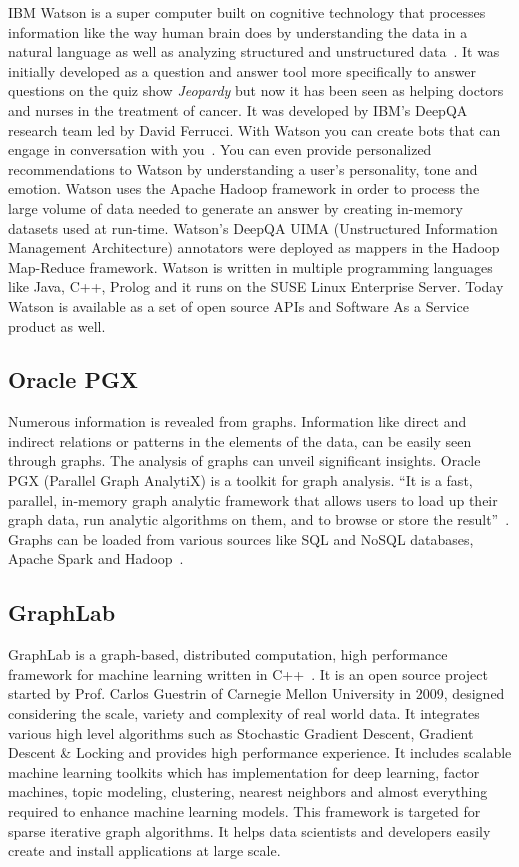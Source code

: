 IBM Watson is a super computer built on cognitive technology that
processes information like the way human brain does by understanding
the data in a natural language as well as analyzing structured and
unstructured data~\cite{www-ibmwatson-wiki}.  It was initially
developed as a question and answer tool more specifically to answer
questions on the quiz show \textit{Jeopardy} but now it has been seen as
helping doctors and nurses in the treatment of cancer. It was
developed by IBM's DeepQA research team led by David Ferrucci. With
Watson you can create bots that can engage in conversation with
you~\cite{www-ibmwatson}. You can even provide personalized
recommendations to Watson by understanding a user's personality, tone
and emotion. Watson uses the Apache Hadoop framework in order to
process the large volume of data needed to generate an answer by
creating in-memory datasets used at run-time. Watson's DeepQA UIMA
(Unstructured Information Management Architecture) annotators were
deployed as mappers in the Hadoop Map-Reduce framework. Watson is
written in multiple programming languages like Java, C++, Prolog and
it runs on the SUSE Linux Enterprise Server. Today Watson is available
as a set of open source APIs and Software As a Service product as
well\cite{www-ibmwatson}.

    \pv
    
\subsection{Oracle PGX}

Numerous information is revealed from graphs. Information like direct
and indirect relations or patterns in the elements of the data, can be
easily seen through graphs. The analysis of graphs can unveil
significant insights. Oracle PGX (Parallel Graph AnalytiX) is a
toolkit for graph analysis.  ``It is a fast, parallel, in-memory graph
analytic framework that allows users to load up their graph data, run
analytic algorithms on them, and to browse or store the
result''~\cite{www-pgx}. Graphs can be loaded from various sources
like SQL and NoSQL databases, Apache Spark and Hadoop~\cite{www-ora}.
    
\subsection{GraphLab}

GraphLab is a graph-based, distributed computation, high performance
framework for machine learning written in C++~\cite{www-graphlab}. It
is an open source project started by Prof. Carlos Guestrin of Carnegie
Mellon University in 2009, designed considering the scale, variety and
complexity of real world data. It integrates various high level
algorithms such as Stochastic Gradient Descent, Gradient Descent \&
Locking and provides high performance experience. It includes scalable
machine learning toolkits which has implementation for deep learning,
factor machines, topic modeling, clustering, nearest neighbors and
almost everything required to enhance machine learning models. This
framework is targeted for sparse iterative graph algorithms. It helps
data scientists and developers easily create and install applications
at large scale.

